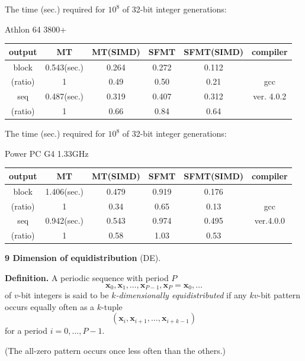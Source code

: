 \documentclass[a4j,12pt,landscape]{jarticle}
\def\bx{{{\mathbf x}}}
\begin{document}
\newpage
\begin{center}
The time (sec.) required for $10^8$ 
of 32-bit integer generations:

Athlon 64 3800+

\vskip 2mm
\begin{tabular}{|c||c|c|c|c|c|}
\hline
output & MT & MT{\Large(SIMD)} & SFMT & SFMT{\Large (SIMD)} & compiler
\\ \hline \hline
block & 0.543(sec.) & 0.264 & 0.272 & 0.112 & \phantom{intel C/C++}\\
 \cline{2-5}
(ratio)& 1     & 0.49\phantom{0}  & 0.50\phantom{0} & 0.21\phantom{0} & gcc \\ \cline{1-5}
seq & 0.487(sec.) & 0.319 & 0.407 & 0.312 & ver. 4.0.2\\ \cline{2-5}
(ratio)& 1     & 0.66\phantom{0}  & 0.84\phantom{0} & 0.64\phantom{0} & \\ \hline
\end{tabular}
\end{center}
\newpage
\begin{center}
The time (sec.) required for $10^8$ 
of 32-bit integer generations:

Power PC G4 1.33GHz

\vskip 2mm
\begin{tabular}{|c||c|c|c|c|c|}
\hline
output & MT & MT{\Large(SIMD)} & SFMT & SFMT{\Large (SIMD)} & compiler
\\ \hline \hline
block &1.406(sec.) & 0.479 & 0.919 & 0.176 & \phantom{intel C/C++}\\ \cline{2-5}
(ratio)& 1     & 0.34\phantom{0}  & 0.65\phantom{0} & 0.13\phantom{0} & gcc \\ \cline{1-5}
 seq & 0.942(sec.) & 0.543 & 0.974 & 0.495 & ver.4.0.0 \\ \cline{2-5}
(ratio)& 1     & 0.58\phantom{0} & 1.03\phantom{0} & 0.53\phantom{0} & \\ \hline
\end{tabular}
\end{center}

\newpage
\noindent
{\bf 9 Dimension of equidistribution} (DE).

{\bf Definition.} 
A periodic sequence with period $P$
$$\bx_0, \bx_1, \ldots, \bx_{P-1}, \bx_P=\bx_0, \ldots$$
of $v$-bit integers is said to be {\em $k$-dimensionally equidistributed}
if any $kv$-bit pattern occurs equally often as a $k$-tuple
$$
(\bx_i, \bx_{i+1}, \ldots, \bx_{i+k-1})
$$
for a period $i=0,\ldots, P-1$. 

(The all-zero pattern occurs once less often than the others.)
\end{document}
